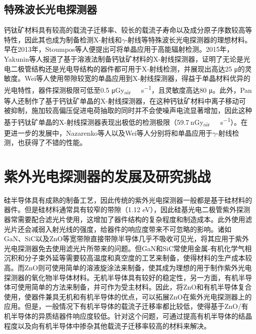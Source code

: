 \documentclass[forlib]{WHUMaster}   %
\begin{document}
{\subsection{特殊波长光电探测器}

钙钛矿材料具有较高的载流子迁移率、较长的载流子寿命以及成分原子序数较高等特性，因此其也成为制备检测X-射线和$\gamma$-射线等特殊波长光电探测器的理想材料。早在2013年，Stoumpos等人便提出可将单晶应用于高能辐射检测\cite{RN169}。2015年，Yakunin等人报道了基于溶液法制备钙钛矿材料的X-射线探测器，证明了无论是光电二极管结构还是光电导结构的器件都可用于X-射线检测，并展现出高达25 μ的灵敏度\cite{RN170}。Wei等人使用带隙较宽的单晶应用到X-射线探测器，得益于单晶材料优异的光电特性，器件探测极限可低至0.5 μ\si{Gy_{air}\ s^{-1}}，且灵敏度高达80 μ\cite{RN171}。此外，Pan等人还制作了基于钙钛矿单晶的X-射线探测器，在这种钙钛矿材料中离子移动可被抑制，施加较高偏压促进电荷抽取的同时并不会使噪声电流显著增加，因此这种基于钙钛矿单晶的X-射线探测器表现出极低的检测极限（59.7 \si{nGy_{air}\ s^{-1}}）\cite{RN172}。在更进一步的发展中，Nazarenko等人\cite{RN174}以及Wei等人\cite{RN173}分别将和单晶应用于$\gamma$-射线检测，也获得了不错的性能。

\section{紫外光电探测器的发展及研究挑战}%

硅半导体具有成熟的制备工艺，因此传统的紫外光电探测器一般都是基于硅材料的器件。但是硅材料通常具有较窄的带隙（1.12 eV），因此硅基光电二极管紫外探测器常需要配合滤光片使用\cite{RN179}，这增加了器件结构的复杂程度和制造成本。此外使用滤光片还会减弱入射光线的强度，给器件的响应度带来不可忽略的影响。诸如GaN、SiC以及ZnO等宽带隙直接带隙半导体几乎不吸收可见光，将其应用于紫外光电探测器免去使用滤光片所带来的问题。但GaN和SiC常使用金属-有机化学气相沉积和分子束外延等需要较高温度和真空度的工艺来制备，使得材料的生产成本较高\cite{RN131,RN25}。而ZnO则可使用简单的溶液旋涂法来制备，使其成为理想的用于制作紫外光电探测器的氧化物半导体材料。\iffalse 但是p型ZnO稳定性较差，使基于ZnO同质结的器件较难制作出来。\fi 无机半导体具有较好的稳定性，另一方面，有机半导体可使用简单的方法来制备，并可作为受主材料。因此，将ZnO和有机半导体复合使用，使器件兼具无机和有机半导体的优点，可以拓展ZnO在紫外光电探测器上的应用。但是，一般情况下有机半导体的载流子迁移率都比较低，使得基于ZnO/有机半导体的异质结器件响应度较低。针对这个问题，可通过提高有机半导体的结晶程度以及向有机半导体中掺杂其他载流子迁移率较高的材料来解决\cite{RN183}。

}
\end{document}
